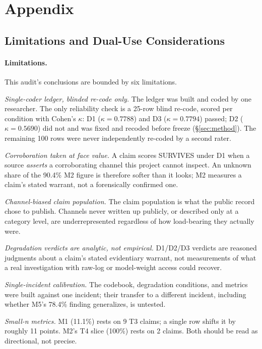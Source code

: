 \documentclass[10pt]{article}
\begin{document}
\section*{Appendix}
\label{app:main}

\subsection*{Limitations and Dual-Use Considerations}
\label{app:limitations}

\paragraph{Limitations.}
This audit's conclusions are bounded by six limitations.

\textit{Single-coder ledger, blinded re-code only.} The ledger was built and
coded by one researcher. The only reliability check is a 25-row blind
re-code, scored per condition with Cohen's $\kappa$: D1 ($\kappa=0.7788$)
and D3 ($\kappa=0.7794$) passed; D2 ($\kappa=0.5690$) did not and was fixed
and recoded before freeze (\S\ref{sec:method}). The remaining 100 rows were
never independently re-coded by a second rater.

\textit{Corroboration taken at face value.} A claim scores SURVIVES under
D1 when a source \emph{asserts} a corroborating channel this project cannot
inspect. An unknown share of the 90.4\% M2 figure is therefore softer than
it looks; M2 measures a claim's stated warrant, not a forensically
confirmed one.

\textit{Channel-biased claim population.} The claim population is what the
public record chose to publish. Channels never written up publicly, or
described only at a category level, are underrepresented regardless of how
load-bearing they actually were.

\textit{Degradation verdicts are analytic, not empirical.} D1/D2/D3
verdicts are reasoned judgments about a claim's stated evidentiary warrant,
not measurements of what a real investigation with raw-log or model-weight
access could recover.

\textit{Single-incident calibration.} The codebook, degradation conditions,
and metrics were built against one incident; their transfer to a different
incident, including whether M5's 78.4\% finding generalizes, is untested.

\textit{Small-\emph{n} metrics.} M1 (11.1\%) rests on 9 T3 claims; a single
row shifts it by roughly 11 points. M2's T4 slice (100\%) rests on 2
claims. Both should be read as directional, not precise.
\end{document}
